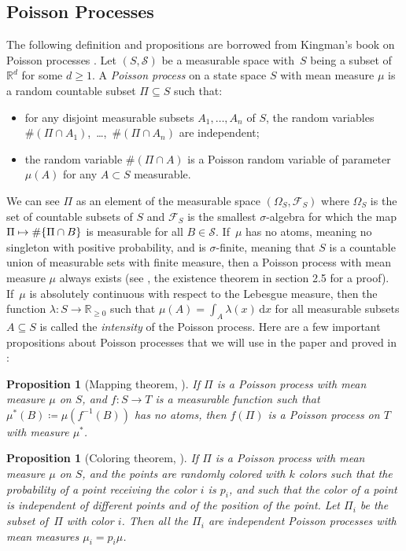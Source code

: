 \documentclass[10pt,a4paper]{article}
\newcommand{\RR}{\mathbb{R}}
\newcommand{\riemint}[4]{\int_{#1}^{#2}\! #3 \, \mathrm{d}#4}
\theoremstyle{plain}
\newtheorem{prop}[cor]{Proposition}
\theoremstyle{definition}
\begin{document}
\subsection{Poisson Processes}

The following definition and propositions are borrowed from Kingman's book on Poisson processes \cite{Kingman93}. Let $(S, \mathcal S)$ be a measurable space with~$S$ being a subset of $\RR^d$ for some $d \ge 1$. A \textit{Poisson process} on a state space $S$ with mean measure $\mu$ is a random countable subset $\Pi \subseteq S$ such that:
\begin{itemize}
\item for any disjoint measurable subsets $A_1, \ldots, A_n$ of $S$, the random variables \hbox{$\#(\Pi \cap A_1)$, \dots, $\#(\Pi \cap A_n)$} are independent;

\item the random variable $\#(\Pi \cap A)$ is a Poisson random variable of parameter $\mu(A)$ for any $A\subset S$ measurable.
\end{itemize}
We can see $\Pi$ as an element of the measurable space $(\Omega_S, \mathcal F_S)$ where $\Omega_S$ is the set of countable subsets of $S$ and $\mathcal F_S$ is the smallest $\sigma$-algebra for which the map $\Pi \mapsto \#\{\Pi \cap\nobreak B\}$ is measurable for all $B \in \mathcal S$. If~$\mu$ has no atoms, meaning no singleton with positive probability, and is $\sigma$-finite, meaning that $S$ is a countable union of measurable sets with finite measure, then a Poisson process with mean measure $\mu$ always exists (see \cite{Kingman93}, the existence theorem in section 2.5 for a proof). If~$\mu$ is absolutely continuous with respect to the Lebesgue measure, then the function \hbox{$\lambda \colon S \to \RR_{\ge 0}$} such that $\mu(A) = \riemint{A}{}{\lambda(x)}{x}$ for all measurable subsets $A \subseteq S$ is called the \textit{intensity} of the Poisson process. Here are a few important propositions about Poisson processes that we will use in the paper and proved in \cite{Kingman93}:

\begin{prop}[Mapping theorem, {\cite[\S2.3]{Kingman93}}]
\label{prel:map}
If $\Pi$ is a Poisson process with mean measure $\mu$ on $S$, and $f:S \to T$ is a measurable function such that $\mu^*(B) \coloneqq \mu(f^{-1}(B))$ has no atoms, then $f(\Pi)$ is a Poisson process on $T$ with measure $\mu^*$.
\end{prop}

\begin{prop}[Coloring theorem, {\cite[\S5.1]{Kingman93}}]
\label{prel:color}
If $\Pi$ is a Poisson process with mean measure $\mu$ on $S$, and the points are randomly colored with $k$ colors such that the probability of a point receiving the color $i$ is $p_i$, and such that the color of a point is independent of different points and of the position of the point. Let $\Pi_i$ be the subset of~$\Pi$ with color $i$. Then all the $\Pi_i$ are independent Poisson processes with mean measures $\mu_i = p_i\mu$.
\end{prop}
\end{document}
